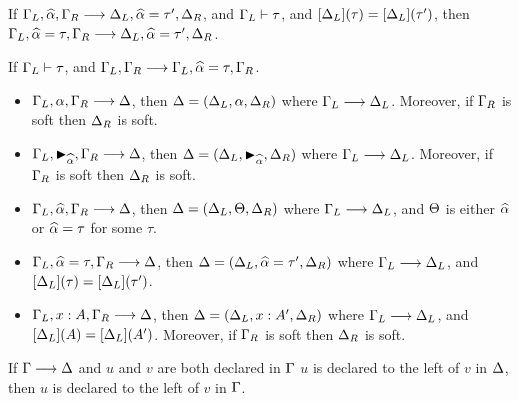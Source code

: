 \begin{lemma}
  \label{lemma:dunfield:ParallelExtensionSolution}
  If $\Gamma_L, \widehat{\alpha}, \Gamma_R \longrightarrow \Delta_L, \widehat{\alpha} = \tau', \Delta_R $,
  and $\Gamma_L \vdash \tau  $,
  and  $[\Delta_L](\tau) = [\Delta_L](\tau') $,
  then $\Gamma_L, \widehat{\alpha} = \tau, \Gamma_R \longrightarrow \Delta_L, \widehat{\alpha} = \tau', \Delta_R $.
\end{lemma}

\begin{lemma}
  \label{lemma:dunfield:SolvedVariableAdditionForExtension}
  If $\Gamma_L \vdash \tau$,
  and $\Gamma_L, \Gamma_R \longrightarrow \Gamma_L, \widehat{\alpha} = \tau, \Gamma_R $.
\end{lemma}

\begin{lemma}\leavevmode
  \label{lemma:dunfield:ExtensionOrder}
  \begin{itemize}
  \item $\Gamma_L, \alpha, \Gamma_R \longrightarrow \Delta$,
    then $\Delta = (\Delta_L, \alpha, \Delta_R)$
    where $\Gamma_L \longrightarrow \Delta_L$.
    Moreover, if $\Gamma_R$ is soft then $\Delta_R$ is soft.
  \item $\Gamma_L, \blacktriangleright_{\widehat{\alpha}}, \Gamma_R \longrightarrow \Delta$,
    then $\Delta = (\Delta_L, \blacktriangleright_{\widehat{\alpha}}, \Delta_R)$
    where $\Gamma_L \longrightarrow \Delta_L$.
    Moreover, if $\Gamma_R$ is soft then $\Delta_R$ is soft.
  \item $\Gamma_L, \widehat{\alpha}, \Gamma_R \longrightarrow \Delta$,
    then $\Delta = (\Delta_L, \Theta, \Delta_R)$
    where $\Gamma_L \longrightarrow \Delta_L$,
    and $\Theta$ is either $\widehat{\alpha}$ or $\widehat{\alpha} = \tau$ for some $\tau$.
  \item $\Gamma_L, \widehat{\alpha} = \tau, \Gamma_R \longrightarrow \Delta$,
    then $\Delta = (\Delta_L, \widehat{\alpha} = \tau', \Delta_R)$
    where $\Gamma_L \longrightarrow \Delta_L$,
    and $[\Delta_L](\tau) = [\Delta_L](\tau')$.
  \item $\Gamma_L, x : A, \Gamma_R \longrightarrow \Delta$,
    then $\Delta = (\Delta_L, x : A', \Delta_R)$
    where $\Gamma_L \longrightarrow \Delta_L$,
    and $[\Delta_L](A) = [\Delta_L](A')$.
    Moreover, if $\Gamma_R$ is soft then $\Delta_R$ is soft.
  \end{itemize}
\end{lemma}

\begin{lemma}
  \label{lemma:dunfield:ReverseDeclarationOrderPreservation}
  If $\Gamma \longrightarrow \Delta$ and $u$ and $v$ are both declared in $\Gamma$ $u$ is
  declared to the left of $v$ in $\Delta$,
  then $u$ is declared to the left of $v$ in $\Gamma$.
\end{lemma}


